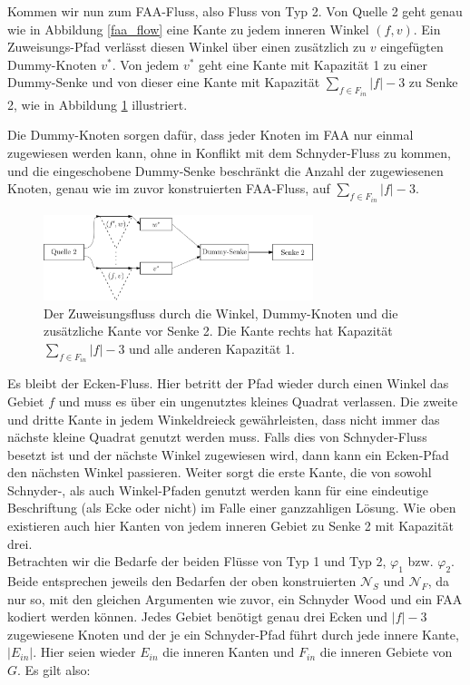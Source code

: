 Kommen wir nun zum FAA-Fluss, also Fluss von Typ 2. Von Quelle 2 geht genau wie in Abbildung \ref{faa_flow} eine Kante zu jedem inneren Winkel $(f,v)$. Ein Zuweisungs-Pfad verlässt diesen Winkel über einen zusätzlich zu $v$ eingefügten Dummy-Knoten $v^*$. Von jedem $v^*$ geht eine Kante mit Kapazität 1 zu einer Dummy-Senke und von dieser eine Kante mit Kapazität $\sum_{f \in F_{in}} |f|-3$ zu Senke 2, wie in Abbildung \ref{dummy_sink} illustriert.

Die Dummy-Knoten sorgen dafür, dass jeder Knoten im FAA nur einmal zugewiesen werden kann, ohne in Konflikt mit dem Schnyder-Fluss zu kommen, und die eingeschobene Dummy-Senke beschränkt die Anzahl der zugewiesenen Knoten, genau wie im zuvor konstruierten FAA-Fluss, auf $\sum_{f \in F_{in}} |f|-3$.
\begin{figure}[h]
	\centering
  	\includegraphics[width=0.7\textwidth]{dummy_sink.png}
  	\caption{Der Zuweisungsfluss durch die Winkel, Dummy-Knoten und die zusätzliche Kante vor Senke 2. Die Kante rechts hat Kapazität $\sum_{f \in F_{in}} |f|-3$ und alle anderen Kapazität 1.}
	\label{dummy_sink}
\end{figure}
Es bleibt der Ecken-Fluss. Hier betritt der Pfad wieder durch einen Winkel das Gebiet $f$ und muss es über ein ungenutztes kleines Quadrat verlassen. Die zweite und dritte Kante in jedem Winkeldreieck gewährleisten, dass nicht immer das nächste kleine Quadrat genutzt werden muss. Falls dies von Schnyder-Fluss besetzt ist und der nächste Winkel zugewiesen wird, dann kann ein Ecken-Pfad den nächsten Winkel passieren. Weiter sorgt die erste Kante, die von sowohl Schnyder-, als auch Winkel-Pfaden genutzt werden kann für eine eindeutige Beschriftung (als Ecke oder nicht) im Falle einer ganzzahligen Lösung. Wie oben existieren auch hier Kanten von jedem inneren Gebiet zu Senke 2 mit Kapazität drei.\\

Betrachten wir die Bedarfe der beiden Flüsse von Typ 1 und Typ 2, $\varphi_1$ bzw. $\varphi_2$. Beide entsprechen jeweils den Bedarfen der oben konstruierten $\mathcal{N}_S$ und $\mathcal{N}_F$, da nur so, mit den gleichen Argumenten wie zuvor, ein Schnyder Wood und ein FAA kodiert werden können. Jedes Gebiet benötigt genau drei Ecken und $|f|-3$ zugewiesene Knoten und der je ein Schnyder-Pfad führt durch jede innere Kante, $|E_{in}|$. Hier seien wieder $E_{in}$ die inneren Kanten und $F_{in}$ die inneren Gebiete von $G$. Es gilt also:

